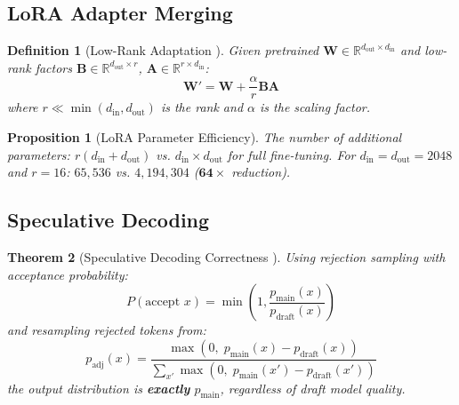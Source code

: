 \documentclass[12pt,a4paper]{article}
\newtheorem{definition}{Definition}[section]
\newtheorem{theorem}{Theorem}[section]
\newtheorem{proposition}[theorem]{Proposition}
\begin{document}
\subsection{LoRA Adapter Merging}

\begin{definition}[Low-Rank Adaptation \citep{hu2022lora}]
Given pretrained $\bm{W} \in \mathbb{R}^{d_{\text{out}} \times d_{\text{in}}}$ and low-rank factors $\bm{B} \in \mathbb{R}^{d_{\text{out}} \times r}$, $\bm{A} \in \mathbb{R}^{r \times d_{\text{in}}}$:
\begin{equation}
\boxed{\bm{W}' = \bm{W} + \frac{\alpha}{r} \bm{B}\bm{A}}
\label{eq:lora}
\end{equation}
where $r \ll \min(d_{\text{in}}, d_{\text{out}})$ is the rank and $\alpha$ is the scaling factor.
\end{definition}

\begin{proposition}[LoRA Parameter Efficiency]
The number of additional parameters: $r(d_{\text{in}} + d_{\text{out}})$ vs. $d_{\text{in}} \times d_{\text{out}}$ for full fine-tuning. For $d_{\text{in}} = d_{\text{out}} = 2048$ and $r = 16$: $65,536$ vs. $4,194,304$ ($\mathbf{64\times}$ reduction).
\end{proposition}

\subsection{Speculative Decoding}

\begin{theorem}[Speculative Decoding Correctness \citep{leviathan2023speculative}]
\label{thm:spec}
Using rejection sampling with acceptance probability:
\begin{equation}
P(\text{accept } x) = \min\left(1, \frac{p_{\text{main}}(x)}{p_{\text{draft}}(x)}\right)
\label{eq:spec_accept}
\end{equation}
and resampling rejected tokens from:
\begin{equation}
p_{\text{adj}}(x) = \frac{\max\left(0,\; p_{\text{main}}(x) - p_{\text{draft}}(x)\right)}{\displaystyle\sum_{x'} \max\left(0,\; p_{\text{main}}(x') - p_{\text{draft}}(x')\right)}
\label{eq:spec_resample}
\end{equation}
the output distribution is \textbf{exactly} $p_{\text{main}}$, regardless of draft model quality.
\end{theorem}
\end{document}
